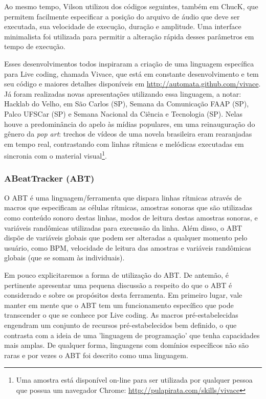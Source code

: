 
Ao mesmo tempo, Vilson utilizou dos códigos seguintes, também em
ChucK, que permitem facilmente especificar a posição do arquivo de
áudio que deve ser executada, sua velocidade de execução, duração e
amplitude. Uma interface minimalista foi utilizada para permitir a
alteração rápida desses parâmetros em tempo de execução.



Esses desenvolvimentos todos inspiraram a criação de uma linguagem
específica para Live coding, chamada Vivace, que está em constante
desenvolvimento e tem seu código e maiores detalhes disponíveis em
\url{http://automata.github.com/vivace}. Já foram realizadas novas
apresentações utilizando essa linguagem, a notar: Hacklab do Velho, em
São Carlos (SP), Semana da Comunicação FAAP (SP), Palco UFSCar (SP) e
Semana Nacional da Ciência e Tecnologia (SP). Nelas houve a
predominância do apelo às mídias populares, em uma reinauguração do
gênero da \emph{pop art}: trechos de vídeos de uma novela brasileira
eram rearanjadas em tempo real, contrastando com linhas rítmicas e
melódicas executadas em sincronia com o material visual\footnote{Uma
  amostra está disponível on-line para ser utilizada por qualquer
  pessoa que possua um navegador Chrome:
  \url{http://pulapirata.com/skills/vivace}}.

\subsubsection{ABeatTracker (ABT)}

O ABT é uma linguagem/ferramenta que dispara linhas rítmicas através
de macros que especificam as células rítmicas, amostras sonoras que
são utilizadas como conteúdo sonoro destas linhas, modos de leitura
destas amostras sonoras, e variáveis randômicas utilizadas para
execussão da linha. Além disso, o ABT dispõe de variáveis globais que
podem ser alteradas a qualquer momento pelo usuário, como BPM,
velocidade de leitura das amostras e variáveis randômicas globais (que
se somam às individuais).

Em pouco explicitaremos a forma de utilização do ABT. De antemão, é
pertinente apresentar uma pequena discussão a respeito do que o ABT é
considerado e sobre os propósitos desta ferramenta. Em primeiro lugar,
vale manter em mente que o ABT tem um funcionamento específico que
pode transcender o que se conhece por Live coding. As macros
pré-estabelecidas engendram um conjunto de recursos pré-estabelecidos
bem definido, o que contrasta com a ideia de uma 'linguagem de
programação' que tenha capacidades mais amplas. De qualquer forma,
linguagens com domínios específicos não são raras e por vezes o ABT
foi descrito como uma linguagem.

